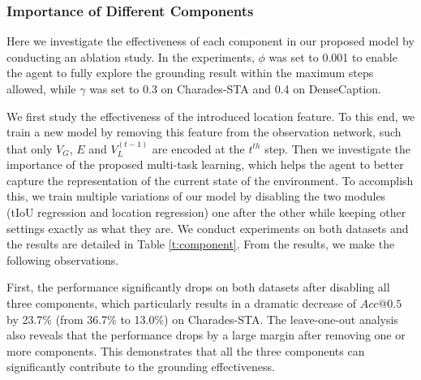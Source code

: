 \documentclass[letterpaper]{article} %
\begin{document}
\subsubsection{Importance of Different Components}
Here we investigate the effectiveness of each component in our proposed model by conducting an ablation study. In the experiments, $\phi$ was set to 0.001 to enable the agent to fully explore the grounding result within the maximum steps allowed, while $\gamma$ was set to 0.3 on Charades-STA and 0.4 on DenseCaption.

We first study the effectiveness of the introduced location feature. To this end, we train a new model by removing this feature from the observation network, such that only $V_G$, $E$ and $V_L^{(t-1)}$ are encoded at the $t^{th}$ step. Then we investigate the importance of the proposed multi-task learning, which helps the agent to better capture the representation of the current state of the environment. To accomplish this, we train multiple variations of our model by disabling the two modules (tIoU regression and location regression) one after the other while keeping other settings exactly as what they are.
We conduct experiments on both datasets and the results are detailed in Table \ref{t:component}. From the results, we make the following observations.

First, the performance significantly drops on both datasets after disabling all three components, which particularly results in a dramatic decrease of $Acc@0.5$ by 23.7\% (from 36.7\% to 13.0\%) on Charades-STA. The leave-one-out analysis also reveals that the performance drops by a large margin after removing one or more components. This demonstrates that all the three components can significantly contribute to the grounding effectiveness.
\end{document}
